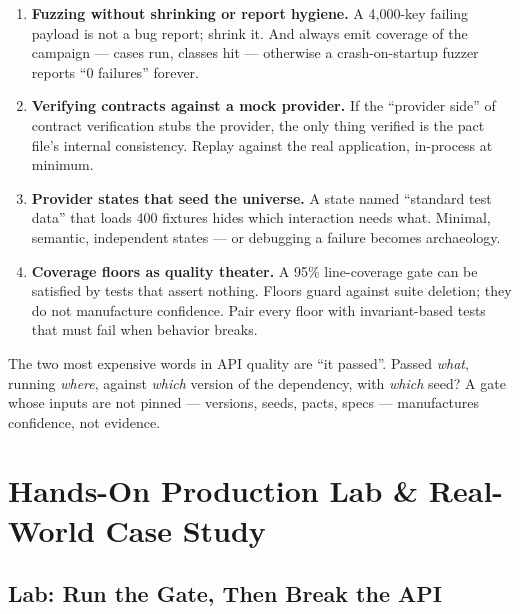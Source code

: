 \begin{enumerate}[label=\textbf{P-\arabic*.}, leftmargin=1.9cm]
        Policy: two flakes in a week means fix or delete; automatic retry
        in CI is allowed only with failure-cause logging and a flake
        dashboard.
  \item \textbf{Fuzzing without shrinking or report hygiene.} A 4{,}000-key
        failing payload is not a bug report; shrink it. And always emit
        coverage of the campaign --- cases run, classes hit --- otherwise
        a crash-on-startup fuzzer reports ``0 failures'' forever.
  \item \textbf{Verifying contracts against a mock provider.} If the
        ``provider side'' of contract verification stubs the provider, the
        only thing verified is the pact file's internal consistency.
        Replay against the real application, in-process at minimum.
  \item \textbf{Provider states that seed the universe.} A state named
        ``standard test data'' that loads 400 fixtures hides which
        interaction needs what. Minimal, semantic, independent states ---
        or debugging a failure becomes archaeology.
  \item \textbf{Coverage floors as quality theater.} A 95\% line-coverage
        gate can be satisfied by tests that assert nothing. Floors guard
        against suite deletion; they do not manufacture confidence. Pair
        every floor with invariant-based tests that must fail when behavior
        breaks.
\end{enumerate}

\begin{warningbox}
The two most expensive words in API quality are ``it passed''. Passed
\emph{what}, running \emph{where}, against \emph{which} version of the
dependency, with \emph{which} seed? A gate whose inputs are not pinned
--- versions, seeds, pacts, specs --- manufactures confidence, not
evidence.
\end{warningbox}

\section{Hands-On Production Lab \& Real-World Case Study}
\label{sec:ch19-lab}

\subsection{Lab: Run the Gate, Then Break the API}
\label{sec:ch19-labsteps}

